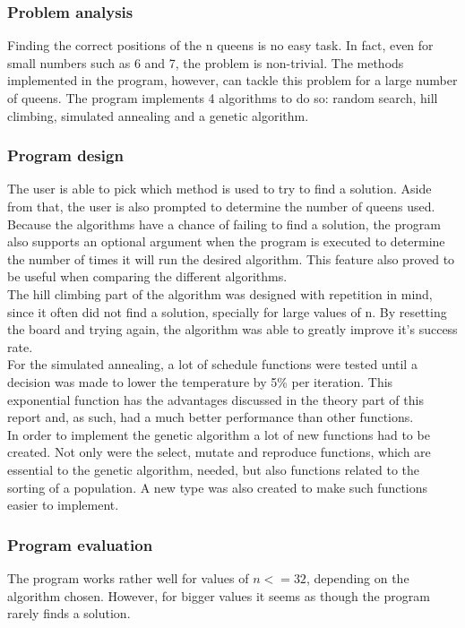 \documentclass{article}
\begin{document}
\subsubsection*{Problem analysis}
Finding the correct positions of the n queens is no easy task. In fact, even for small numbers such as 6 and 7, the problem is non-trivial. The methods implemented in the program, however, can tackle this problem for a large number of queens. The program implements 4 algorithms to do so: random search, hill climbing, simulated annealing and a genetic algorithm.

\subsubsection*{Program design}
The user is able to pick which method is used to try to find a solution. Aside from that, the user is also prompted to determine the number of queens used. Because the algorithms have a chance of failing to find a solution, the program also supports an optional argument when the program is executed to determine the number of times it will run the desired algorithm. This feature also proved to be useful when comparing the different algorithms.\\
The hill climbing part of the algorithm was designed with repetition in mind, since it often did not find a solution, specially for large values of n. By resetting the board and trying again, the algorithm was able to greatly improve it's success rate.\\
For the simulated annealing, a lot of schedule functions were tested until a decision was made to lower the temperature by 5\% per iteration. This exponential function has the advantages discussed in the theory part of this report and, as such, had a much better performance than other functions.\\
In order to implement the genetic algorithm a lot of new functions had to be created. Not only were the select, mutate and reproduce functions, which are essential to the genetic algorithm, needed, but also functions related to the sorting of a population. A new type was also created to make such functions easier to implement.

\subsubsection*{Program evaluation}

The program works rather well for values of $n <= 32$, depending on the algorithm chosen. However, for bigger values it seems as though the program rarely finds a solution. 
\end{document}
